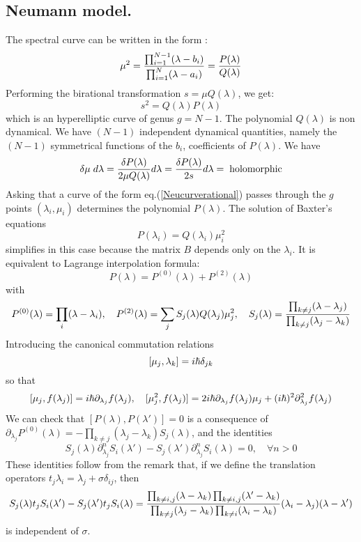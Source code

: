 \documentclass[a4paper,11pt]{article}
\begin{document}
\subsection{Neumann model.}
The spectral curve can be written in the form \cite{BaBeTa03}:
\begin{equation}
 \mu^2 = { \prod_{i=1}^{N-1}(\lambda-b_i) \over  \prod_{i=1}^{N}(\lambda-a_i) } 
 =  {P(\lambda) \over Q(\lambda) } 
\label{Neucurverational}
\end{equation}
Performing the birational transformation $ s= \mu Q(\lambda)$, we get:
\begin{equation}
s^2=Q(\lambda)P(\lambda)
\label{Neucurve3}
\end{equation}
which is an hyperelliptic curve of genus $g=N-1$. The polynomial $Q(\lambda)$
is non dynamical. We have $(N-1)$ independent
dynamical quantities, namely the $(N-1)$ symmetrical functions of the $b_i$, coefficients of 
$P(\lambda)$. 
We have
\begin{eqnarray*}
\delta \mu \;d\lambda =  {\delta P(\lambda) \over 2 \mu Q(\lambda)} d\lambda = 
 {\delta P(\lambda) \over 2 s} d\lambda =\;{\rm holomorphic}
\end{eqnarray*}
Asking that a curve of the form eq.(\ref{Neucurverational}) passes through
the $g$ points $(\lambda_i,\mu_i)$ determines the polynomial $P(\lambda)$.
The solution of Baxter's equations
$$
P(\lambda_i ) =  Q(\lambda_i) \mu_i^2
$$
simplifies in this case because the matrix $B$ depends only on the $\lambda_i$. 
It is equivalent to Lagrange interpolation formula:
$$
P(\lambda) = P^{(0)}(\lambda) + P^{(2)}(\lambda)
$$
with
$$
P^{(0)}(\lambda) =\prod_i (\lambda - \lambda_i), \quad 
P^{(2)}(\lambda) = \sum_j  S_j (\lambda) Q(\lambda_j)\mu_j^2,\quad
S_j(\lambda) = {\prod_{k\neq j}(\lambda - \lambda_j)\over 
\prod_{k \neq j} (\lambda_j - \lambda_k) } 
$$
Introducing the canonical commutation relations
$$
\relax [ \mu_j , \lambda_k ] = i \hbar \delta_{jk}
$$
so that
\begin{eqnarray*}
\relax [ \mu_j, f(\lambda_j) ] = i\hbar \partial_{\lambda_j} f(\lambda_j),\quad
\relax [ \mu_j^2, f(\lambda_j) ] = 2 i\hbar  \partial_{\lambda_j} f(\lambda_j) \mu_j 
+ (i\hbar)^2 \partial^2_{\lambda_j} f(\lambda_j)
\end{eqnarray*}
We can check that $ [ P(\lambda), P(\lambda') ] =0$ is a consequence of 
$ \partial_{\lambda_j}P^{(0)}(\lambda) = - \prod_{k\neq j} ( \lambda_j - \lambda_k)  S_j(\lambda)$, and the identities
$$
S_j(\lambda) \partial^n_{\lambda_j}S_i(\lambda') - S_j(\lambda') \partial^n_{\lambda_j}S_i(\lambda) =0, \quad \forall n >0
$$
These identities follow from the remark that, if we define the translation operators
$t_j \lambda_i = \lambda_j + \sigma \delta_{ij}$, then
\begin{equation}
 S_j(\lambda) t_j  S_i(\lambda') - S_j(\lambda') t_j  S_i(\lambda) = 
{ \prod_{k\neq i,j}(\lambda - \lambda_k) \prod_{k\neq i,j}(\lambda' - \lambda_k)
\over \prod_{k\neq j} (\lambda_j - \lambda_k) \prod_{k\neq i} (\lambda_i - \lambda_k) }
(\lambda_i - \lambda_j) (\lambda - \lambda')
\label{identitygene1}
\end{equation}
is independent of $\sigma$.
\end{document}
